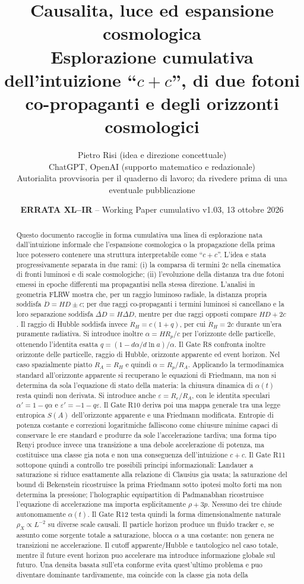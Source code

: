 \documentclass[11pt,a4paper]{article}
\title{\textbf{Causalita, luce ed espansione cosmologica}\\
\large Esplorazione cumulativa dell'intuizione ``$c+c$'', di due fotoni co-propaganti e degli orizzonti cosmologici}
\author{Pietro Risi (idea e direzione concettuale)\\ChatGPT, OpenAI (supporto matematico e redazionale)\\\small Autorialita provvisoria per il quaderno di lavoro; da rivedere prima di una eventuale pubblicazione}
\date{\textbf{ERRATA XL--IR} -- Working Paper cumulativo v1.03, 13 ottobre 2026}
\begin{document}
\maketitle

\begin{abstract}
Questo documento raccoglie in forma cumulativa una linea di esplorazione nata dall'intuizione informale che l'espansione cosmologica o la propagazione della prima luce potessero contenere una struttura interpretabile come ``$c+c$''. L'idea e stata progressivamente separata in due rami: (i) la comparsa di termini $2c$ nella cinematica di fronti luminosi e di scale cosmologiche; (ii) l'evoluzione della distanza tra due fotoni emessi in epoche differenti ma propagantisi nella stessa direzione. L'analisi in geometria FLRW mostra che, per un raggio luminoso radiale, la distanza propria soddisfa $\dot D=HD\pm c$; per due raggi co-propaganti i termini luminosi si cancellano e la loro separazione soddisfa $\dot{\Delta D}=H\Delta D$, mentre per due raggi opposti compare $HD+2c$. Il raggio di Hubble soddisfa invece $\dot R_H=c(1+q)$, per cui $\dot R_H=2c$ durante un'era puramente radiativa. Si introduce inoltre $\alpha=HR_p/c$ per l'orizzonte delle particelle, ottenendo l'identita esatta $q=(1-d\alpha/d\ln a)/\alpha$. Il Gate R8 confronta inoltre orizzonte delle particelle, raggio di Hubble, orizzonte apparente ed event horizon. Nel caso spazialmente piatto $R_A=R_H$ e quindi $\alpha=R_p/R_A$. Applicando la termodinamica standard all'orizzonte apparente si recuperano le equazioni di Friedmann, ma non si determina da sola l'equazione di stato della materia: la chiusura dinamica di $\alpha(t)$ resta quindi non derivata. Si introduce anche $\varepsilon=R_e/R_A$, con le identita speculari $\alpha'=1-q\alpha$ e $\varepsilon'=-1-q\varepsilon$. Il Gate R10 deriva poi una mappa generale tra una legge entropica $S(A)$ dell'orizzonte apparente e una Friedmann modificata. Entropie di potenza costante e correzioni logaritmiche falliscono come chiusure minime capaci di conservare le ere standard e produrre da sole l'accelerazione tardiva; una forma tipo Renyi produce invece una transizione a una debole accelerazione di potenza, ma costituisce una classe gia nota e non una conseguenza dell'intuizione $c+c$. Il Gate R11 sottopone quindi a controllo tre possibili principi informazionali: Landauer a saturazione si riduce esattamente alla relazione di Clausius gia usata; la saturazione del bound di Bekenstein ricostruisce la prima Friedmann sotto ipotesi molto forti ma non determina la pressione; l'holographic equipartition di Padmanabhan ricostruisce l'equazione di accelerazione ma importa esplicitamente $\rho+3p$. Nessuno dei tre chiude autonomamente $\alpha(t)$. Il Gate R12 testa quindi la forma dimensionalmente naturale $\rho_X\propto L^{-2}$ su diverse scale causali. Il particle horizon produce un fluido tracker e, se assunto come sorgente totale a saturazione, blocca $\alpha$ a una costante: non genera ne transizioni ne accelerazione. Il cutoff apparente/Hubble e tautologico nel caso totale, mentre il future event horizon puo accelerare ma introduce informazione globale sul futuro. Una densita basata sull'eta conforme evita quest'ultimo problema e puo diventare dominante tardivamente, ma coincide con la classe gia nota della 
\end{abstract}
\end{document}
